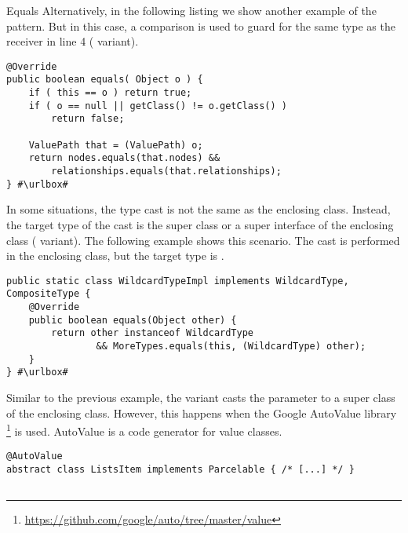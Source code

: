 \begin{pattern}{Equals}
Alternatively, in the following listing we show another example of the \thisp{} pattern.
But in this case,
a  comparison is used to guard for the same type as the receiver in line 4 ( variant).

\def\urlvar{http://bit.ly/neo4j_neo4j_2vKP0MW}
\begin{verbatim}
@Override
public boolean equals( Object o ) {
    if ( this == o ) return true;
    if ( o == null || getClass() != o.getClass() )
        return false;

    ValuePath that = (ValuePath) o;
    return nodes.equals(that.nodes) &&
        relationships.equals(that.relationships);
} #\urlbox#
\end{verbatim}

In some situations, the type cast is not the same as the enclosing class.
Instead, the target type of the cast is the super class or a super interface of the enclosing class ( variant).
The following example shows this scenario.
The cast is performed in the  enclosing class,
but the target type is .

\def\urlvar{http://bit.ly/elastic_elasticsearch_2GHyPp5}
\begin{verbatim}
public static class WildcardTypeImpl implements WildcardType, CompositeType {
    @Override
    public boolean equals(Object other) {
        return other instanceof WildcardType
                && MoreTypes.equals(this, (WildcardType) other);
    }
} #\urlbox#
\end{verbatim}

Similar to the previous example, 
the  variant casts the  parameter to a super class of the enclosing class.
However, this happens when the Google AutoValue library%
\footnote{\url{https://github.com/google/auto/tree/master/value}}
is used.
AutoValue is a code generator for value classes.

\def\urlvar{http://bit.ly/square_sqlbrite_2HmHMYE}
\begin{verbatim}
@AutoValue
abstract class ListsItem implements Parcelable { /* [...] */ }


\end{verbatim}
\end{pattern}
